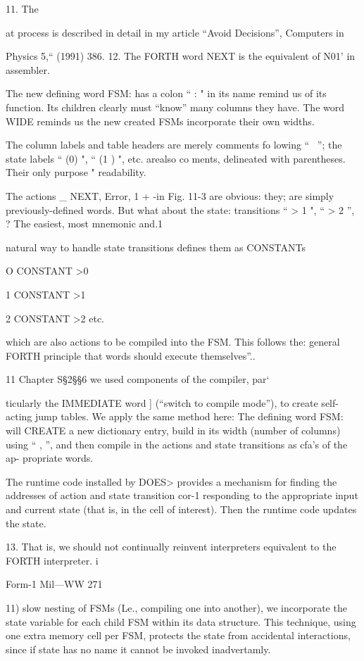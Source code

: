 \documentclass{book}
\begin{document}
11. The

at process is described in detail in my article “Avoid Decisions”, Computers in

Physics 5,“ (1991) 386.
12. The FORTH word NEXT is the equivalent of N01’ in assembler.


The new defining word FSM: has a colon “ : " in its name
remind us of its function. Its children clearly must “know”
many columns they have. The word WIDE reminds us the new
created FSMs incorporate their own widths.

The column labels and table headers are merely comments fo
lowing “ \ ”; the state labels “ (0) ", “ (1 ) ", etc. arealso co
ments, delineated with parentheses. Their only purpose "
readability.

The actions \_ NEXT, Error, 1 + -in Fig. 11-3 are obvious: they;
are simply previously-defined words. But what about the state:
transitions “ > 1 ", “ > 2 ”, ? The easiest, most mnemonic and.1

natural way to handle state transitions defines them as CONSTANTs

 

O CONSTANT >0

1 CONSTANT >1

2 CONSTANT >2
etc.

which are also actions to be compiled into the FSM. This follows the:
general FORTH principle that words should execute themselves”..

11 Chapter S§2§§6 we used components of the compiler, par‘

ticularly the IMMEDIATE word ] (“switch to compile mode”),
to create self-acting jump tables. We apply the same method here:
The defining word FSM: will CREATE a new dictionary entry,
build in its width (number of columns) using “ , ”, and then
compile in the actions and state transitions as cfa’s of the ap-
propriate words.

The runtime code installed by DOES> provides a mechanism
for finding the addresses of action and state transition cor-1
responding to the appropriate input and current state (that is, in
the cell of interest). Then the runtime code updates the state.

 

13. That is, we should not continually reinvent interpreters equivalent to the FORTH interpreter. i

Form-1 Mil—WW 271

11) slow nesting of FSMs (Le., compiling one into another), we
incorporate the state variable for each child FSM within its data
structure. This technique, using one extra memory cell per FSM,
protects the state from accidental interactions, since if state has
no name it cannot be invoked inadvertamly.
\end{document}
